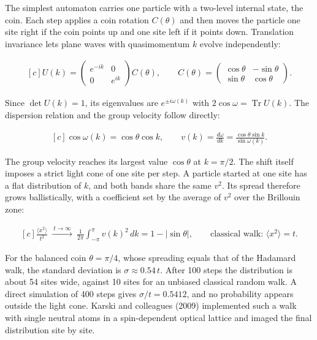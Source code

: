 \documentclass[11pt,oneside]{book}
\newenvironment{centeredalign}{\[\begin{gathered}[c]}{\end{gathered}\]}
\begin{document}
The simplest automaton carries one particle with a two-level internal state, the coin. Each step applies a coin rotation \(C(\theta)\) and then moves the particle one site right if the coin points up and one site left if it points down. Translation invariance lets plane waves with quasimomentum \(k\) evolve independently:

\begin{centeredalign}
U(k)=\begin{pmatrix}e^{-ik}&0\\0&e^{ik}\end{pmatrix}C(\theta),\qquad
C(\theta)=\begin{pmatrix}\cos\theta&-\sin\theta\\ \sin\theta&\cos\theta\end{pmatrix}.
\end{centeredalign}

Since \(\det U(k)=1\), its eigenvalues are \(e^{\pm i\omega(k)}\) with \(2\cos\omega=\operatorname{Tr}U(k)\). The dispersion relation and the group velocity follow directly:

\begin{centeredalign}
\cos\omega(k)=\cos\theta\cos k,\qquad v(k)=\frac{d\omega}{dk}=\frac{\cos\theta\sin k}{\sin\omega(k)}.
\end{centeredalign}

The group velocity reaches its largest value \(\cos\theta\) at \(k=\pi/2\). The shift itself imposes a strict light cone of one site per step. A particle started at one site has a flat distribution of \(k\), and both bands share the same \(v^2\). Its spread therefore grows ballistically, with a coefficient set by the average of \(v^2\) over the Brillouin zone:

\begin{centeredalign}
\frac{\langle x^2\rangle}{t^2}\ \xrightarrow{\ t\to\infty\ }\ \frac{1}{2\pi}\int_{-\pi}^{\pi}v(k)^2\,dk=1-|\sin\theta|,
\qquad\text{classical walk: }\langle x^2\rangle=t.
\end{centeredalign}

For the balanced coin \(\theta=\pi/4\), whose spreading equals that of the Hadamard walk, the standard deviation is \(\sigma\approx0.54\,t\). After 100 steps the distribution is about 54 sites wide, against 10 sites for an unbiased classical random walk. A direct simulation of 400 steps gives \(\sigma/t=0.5412\), and no probability appears outside the light cone. Karski and colleagues (2009) implemented such a walk with single neutral atoms in a spin-dependent optical lattice and imaged the final distribution site by site.
\end{document}
